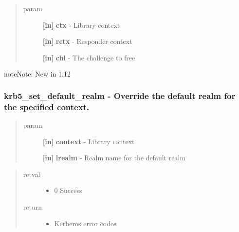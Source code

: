 \documentclass[letterpaper,10pt,english]{sphinxmanual}
\begin{document}
\begin{quote}\begin{description}
\item[{param}] \leavevmode
\textbf{{[}in{]}} \textbf{ctx} - Library context

\textbf{{[}in{]}} \textbf{rctx} - Responder context

\textbf{{[}in{]}} \textbf{chl} - The challenge to free

\end{description}\end{quote}

\begin{notice}{note}{Note:}
New in 1.12
\end{notice}


\subsubsection{krb5\_set\_default\_realm -  Override the default realm for the specified context.}
\label{appdev/refs/api/krb5_set_default_realm::doc}\label{appdev/refs/api/krb5_set_default_realm:krb5-set-default-realm-override-the-default-realm-for-the-specified-context}

\begin{fulllineitems}
\label{appdev/refs/api/krb5_set_default_realm:krb5_set_default_realm}
\end{fulllineitems}

\begin{quote}\begin{description}
\item[{param}] \leavevmode
\textbf{{[}in{]}} \textbf{context} - Library context

\textbf{{[}in{]}} \textbf{lrealm} - Realm name for the default realm

\end{description}\end{quote}
\begin{quote}\begin{description}
\item[{retval}] \leavevmode\begin{itemize}
\item {} 
0   Success

\end{itemize}

\item[{return}] \leavevmode\begin{itemize}
\item {} 
Kerberos error codes

\end{itemize}

\end{description}\end{quote}
\end{document}
